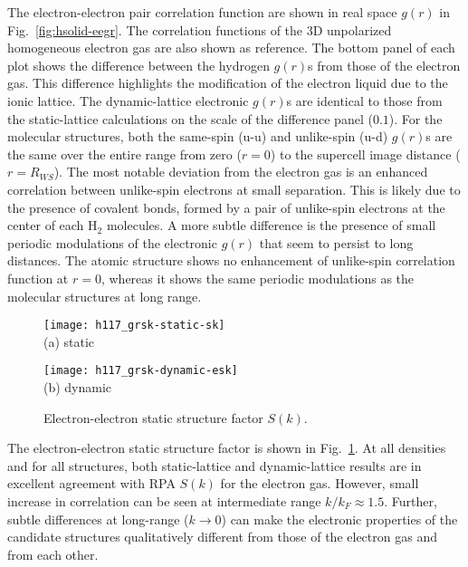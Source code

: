 The electron-electron pair correlation function are shown in real space $g(r)$ in Fig.~\ref{fig:hsolid-eegr}.
The correlation functions of the 3D unpolarized homogeneous electron gas are also shown as reference.
The bottom panel of each plot shows the difference between the hydrogen $g(r)$s from those of the electron gas.
This difference highlights the modification of the electron liquid due to the ionic lattice.
The dynamic-lattice electronic $g(r)$s are identical to those from the static-lattice calculations on the scale of the difference panel ($0.1$).
For the molecular structures, both the same-spin (u-u) and unlike-spin (u-d) $g(r)$s are the same over the entire range from zero ($r=0$) to the supercell image distance ($r=R_{WS}$).
The most notable deviation from the electron gas is an enhanced correlation between unlike-spin electrons at small separation.
This is likely due to the presence of covalent bonds, formed by a pair of unlike-spin electrons at the center of each H$_2$ molecules.
A more subtle difference is the presence of small periodic modulations of the electronic $g(r)$ that seem to persist to long distances.
The atomic structure shows no enhancement of unlike-spin correlation function at $r=0$, whereas it shows the same periodic modulations as the molecular structures at long range.

\begin{figure}[h]
\centering
\begin{minipage}{0.49\textwidth}
\centering
\texttt{[image: h117\_grsk-static-sk]}\\
(a) static
\end{minipage}
\begin{minipage}{0.49\textwidth}
\centering
\texttt{[image: h117\_grsk-dynamic-esk]}\\
(b) dynamic
\end{minipage}
\caption{Electron-electron static structure factor $S(k)$.}
\label{fig:hsolid-esk}
\end{figure}

The electron-electron static structure factor is shown in Fig.~\ref{fig:hsolid-esk}.
At all densities and for all structures, both static-lattice and dynamic-lattice results are in excellent agreement with RPA $S(k)$ for the electron gas.
However, small increase in correlation can be seen at intermediate range $k/k_F\approx 1.5$.
Further, subtle differences at long-range ($k\rightarrow0$) can make the electronic properties of the candidate structures qualitatively different from those of the electron gas and from each other.


